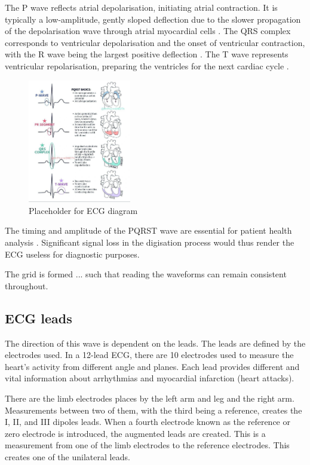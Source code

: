 The P wave reflects atrial depolarisation, initiating atrial contraction. It is typically a low-amplitude, gently sloped deflection due to the slower propagation of the depolarisation wave through atrial myocardial cells \cite{OReilly2023ModelDrivenAO}. The QRS complex corresponds to ventricular depolarisation and the onset of ventricular contraction, with the R wave being the largest positive deflection \cite{Prima2018PolyanilineAN}. The T wave represents ventricular repolarisation, preparing the ventricles for the next cardiac cycle \cite{Prima2018PolyanilineAN}.

\begin{figure}[H]
    \centering
    \includegraphics[width=0.4\textwidth]{3_Chapters/2_Chapter_LiteratureReview/Figures/PQRST_complex.jpg}
    \caption{Placeholder for ECG diagram}
    \label{fig:ECG_Waveform}
\end{figure}

The timing and amplitude of the PQRST wave are essential for patient health analysis \cite{Sinha2023SemiSupervisedCD}. Significant signal loss in the digisation process would thus render the ECG useless for diagnostic purposes.

The grid is formed ... such that reading the waveforms can remain consistent throughout.

\subsection{ECG leads}

The direction of this wave is dependent on the leads. The leads are defined by the electrodes used. In a 12-lead ECG, there are 10 electrodes used to measure the heart's activity from different angle and planes. Each lead provides different and vital information about arrhythmias and myocardial infarction (heart attacks). 

There are the limb electrodes places by the left arm and leg and the right arm. Measurements between two of them, with the third being a reference, creates the I, II, and III dipoles leads. When a fourth electrode known as the reference or zero electrode is introduced, the augmented leads are created. This is a measurement from one of the limb electrodes to the reference electrodes. This creates one of the unilateral leads. 

